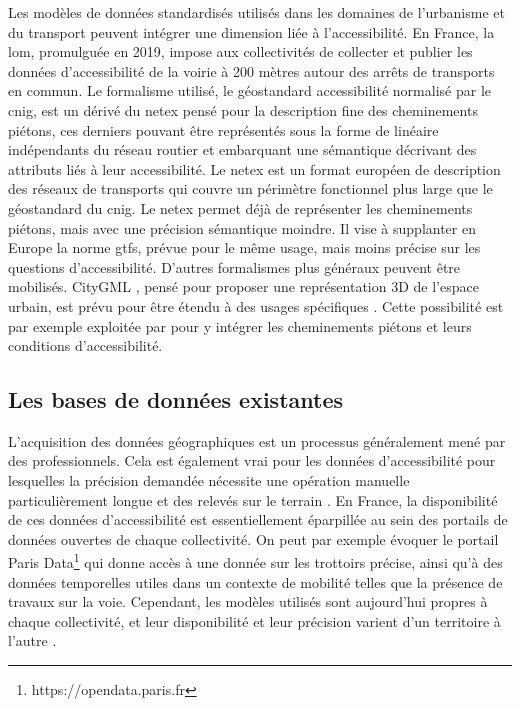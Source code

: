 
\newpar{}


\newpage
Les modèles de données standardisés utilisés dans les domaines de l'urbanisme et du transport peuvent intégrer une dimension liée à l'accessibilité. En France, la \gls{lom}, promulguée en 2019, impose aux collectivités de collecter et publier les données d'accessibilité de la voirie à 200 mètres autour des arrêts de transports en commun. Le formalisme utilisé, le géostandard accessibilité normalisé par le \gls{cnig}, est un dérivé du \gls{netex} pensé pour la description fine des cheminements piétons, ces derniers pouvant être représentés sous la forme de linéaire indépendants du réseau routier et embarquant une sémantique décrivant des attributs liés à leur accessibilité. Le \gls{netex} est un format européen de description des réseaux de transports qui couvre un périmètre fonctionnel plus large que le géostandard du \gls{cnig}. Le \gls{netex} permet déjà de représenter les cheminements piétons, mais avec une précision sémantique moindre. Il vise à supplanter en Europe la norme \gls{gtfs}, prévue pour le même usage, mais moins précise sur les questions d'accessibilité. D'autres formalismes plus généraux peuvent être mobilisés. CityGML \citep{Groeger2012}, pensé pour proposer une représentation 3D de l'espace urbain, est prévu pour être étendu à des usages spécifiques \citep{Biljecki2018}. Cette possibilité est par exemple exploitée par \citet{Wheeler2020} pour y intégrer les cheminements piétons et leurs conditions d'accessibilité.

\subsection{Les bases de données existantes}


L'acquisition des données géographiques est un processus généralement mené par des professionnels. Cela est également vrai pour les données d'accessibilité pour lesquelles la précision demandée nécessite une opération manuelle particulièrement longue et des relevés sur le terrain \citep{Beale2006}. En France, la disponibilité de ces données d'accessibilité est essentiellement éparpillée au sein des portails de données ouvertes de chaque collectivité. On peut par exemple évoquer le portail Paris Data\footnote{https://opendata.paris.fr} qui donne accès à une donnée sur les trottoirs précise, ainsi qu'à des données temporelles utiles dans un contexte de mobilité telles que la présence de travaux sur la voie. Cependant, les modèles utilisés sont aujourd'hui propres à chaque collectivité, et leur disponibilité et leur précision varient d'un territoire à l'autre \citep{Ding2014}.

